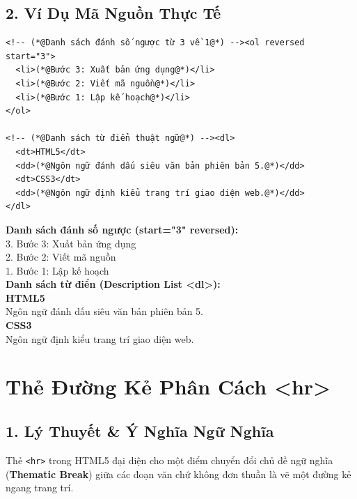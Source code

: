 \documentclass[11pt,oneside]{book}
\newcommand{\codeinline}[1]{\textcolor{accentOrange}{\texttt{#1}}}
\newcommand{\term}[1]{\textbf{\textcolor{primaryBlue}{#1}}}
\begin{document}
\subsection{2. Ví Dụ Mã Nguồn Thực Tế}
\begin{codeWindow}
\begin{lstlisting}[language=HTML5]
<!-- (*@Danh sách đánh số ngược từ 3 về 1@*) --><ol reversed start="3">
  <li>(*@Bước 3: Xuất bản ứng dụng@*)</li>
  <li>(*@Bước 2: Viết mã nguồn@*)</li>
  <li>(*@Bước 1: Lập kế hoạch@*)</li>
</ol>

<!-- (*@Danh sách từ điển thuật ngữ@*) --><dl>
  <dt>HTML5</dt>
  <dd>(*@Ngôn ngữ đánh dấu siêu văn bản phiên bản 5.@*)</dd>
  <dt>CSS3</dt>
  <dd>(*@Ngôn ngữ định kiểu trang trí giao diện web.@*)</dd>
</dl>
\end{lstlisting}
\end{codeWindow}

\begin{browserWindow}
\sffamily\small
\textbf{Danh sách đánh số ngược (start="3" reversed):}\\[2pt]
3. Bước 3: Xuất bản ứng dụng\\
2. Bước 2: Viết mã nguồn\\
1. Bước 1: Lập kế hoạch\\[6pt]
\textbf{Danh sách từ điển (Description List <dl>):}\\[2pt]
\textbf{HTML5}\\
\quad Ngôn ngữ đánh dấu siêu văn bản phiên bản 5.\\[2pt]
\textbf{CSS3}\\
\quad Ngôn ngữ định kiểu trang trí giao diện web.
\end{browserWindow}

\section{Thẻ Đường Kẻ Phân Cách <hr>}
\subsection{1. Lý Thuyết \& Ý Nghĩa Ngữ Nghĩa}
Thẻ \codeinline{<hr>} trong HTML5 đại diện cho một điểm chuyển đổi chủ đề ngữ nghĩa (\term{Thematic Break}) giữa các đoạn văn chứ không đơn thuần là vẽ một đường kẻ ngang trang trí.
\end{document}

